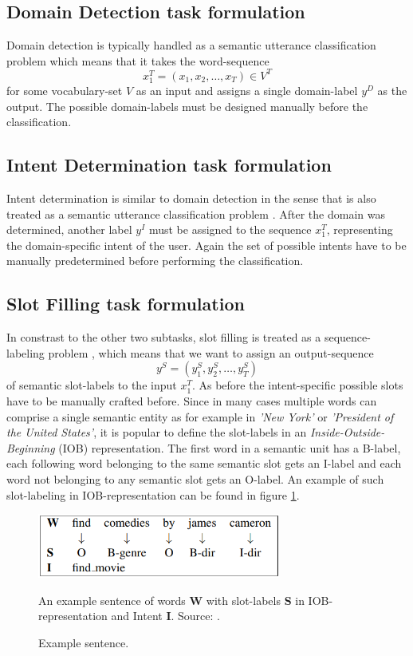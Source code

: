 \documentclass[twoside,11pt,a4paper]{article}
\theoremstyle{break}
\begin{document}
\subsection{Domain Detection task formulation}
Domain detection is typically handled as a semantic utterance classification problem \cite{mesnil:2015} which means that it takes the word-sequence
\[
	x_1^T = (x_1, x_2, \dots, x_T) \in V^T
\]
for some vocabulary-set $V$ as an input and assigns a single domain-label $y^D$ as the output. The possible domain-labels must be designed manually before the classification.

\subsection{Intent Determination task formulation}
Intent determination is similar to domain detection in the sense that is also treated as a semantic utterance classification problem \cite{mesnil:2015}. After the domain was determined, another label $y^I$ must be assigned to the sequence $x_1^T$, representing the domain-specific intent of the user. Again the set of possible intents have to be manually predetermined before performing the classification.

\subsection{Slot Filling task formulation}
\label{subsec:slotfillingtask}
In constrast to the other two subtasks, slot filling is treated as a sequence-labeling problem \cite{mesnil:2013}, which means that we want to assign an output-sequence
\[
	y^S = (y_1^S, y_2^S, \dots, y_T^S)
\]
of semantic slot-labels to the input $x_1^T$. As before the intent-specific possible slots have to be manually crafted before. Since in many cases multiple words can comprise a single semantic entity as for example in \textit{'New York'} or \textit{'President of the United States'}, it is popular to define the slot-labels in an \textit{Inside-Outside-Beginning} (IOB) representation. The first word in a semantic unit has a B-label, each following word belonging to the same semantic slot gets an I-label and each word not belonging to any semantic slot gets an O-label. An example of such slot-labeling in IOB-representation can be found in figure \ref{fig:iob-slots}. 

\begin{figure}[H]
	\begin{center}
		\includegraphics[width=8cm]{iob-slots}
		\caption{Example sentence.}
		An example sentence of words \textbf{W} with slot-labels \textbf{S} in IOB-representation and Intent \textbf{I}. Source: \cite{goo:2018}.
		\label{fig:iob-slots}
	\end{center}
\end{figure}
\end{document}
